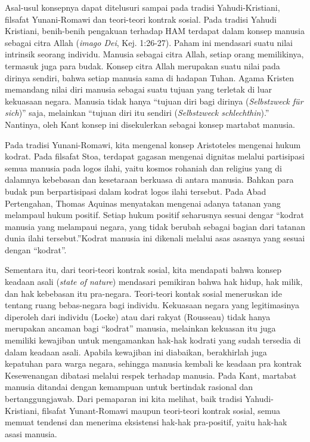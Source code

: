 \documentclass[10pt,a4paper]{article}
\begin{document}
\begin{multicols}{2}
Asal-usul konsepnya dapat ditelusuri sampai pada tradisi
Yahudi-Kristiani, filsafat Yunani-Romawi dan teori-teori kontrak sosial.
Pada tradisi Yahudi Kristiani, benih-benih pengakuan terhadap HAM
terdapat dalam konsep manusia sebagai citra Allah (\emph{imago Dei},
Kej. 1:26-27). Paham ini mendasari suatu nilai intrinsik seorang
individu. Manusia sebagai citra Allah, setiap orang memilikinya,
termasuk juga para budak. Konsep citra Allah merupakan suatu nilai pada
dirinya sendiri, bahwa setiap manusia sama di hadapan Tuhan. Agama
Kristen memandang nilai diri manusia sebagai suatu tujuan yang terletak
di luar kekuasaan negara. Manusia tidak hanya ``tujuan diri bagi dirinya
(\emph{Selbstzweck für sich})'' saja, melainkan ``tujuan diri itu
sendiri (\emph{Selbstzweck schlechthin}).'' Nantinya, oleh Kant konsep
ini disekulerkan sebagai konsep martabat manusia.

Pada tradisi Yunani-Romawi, kita mengenal konsep Aristoteles mengenai
hukum kodrat. Pada filsafat Stoa, terdapat gagasan mengenai dignitas
melalui partisipasi semua manusia pada logos ilahi, yaitu kosmos
rohaniah dan religius yang di dalamnya kebebasan dan kesetaraan berkuasa
di antara manusia. Bahkan para budak pun berpartisipasi dalam kodrat
logos ilahi tersebut. Pada Abad Pertengahan, Thomas Aquinas menyatakan
mengenai adanya tatanan yang melampaul hukum positif. Setiap hukum
positif seharusnya sesuai dengar ``kodrat manusia yang melampaui negara,
yang tidak berubah sebagai bagian dari tatanan dunia ilahi
tersebut.''Kodrat manusia ini dikenali melalui asas asasnya yang sesuai
dengan ``kodrat''.

Sementara itu, dari teori-teori kontrak sosial, kita mendapati bahwa
konsep keadaan asali (\emph{state of nature}) mendasari pemikiran bahwa
hak hidup, hak milik, dan hak kebebasan itu pra-negara. Teori-teori
kontak sosial meneruskan ide tentang ruang bebas-negara bagi individu.
Kekuasaan negara yang legitimasinya diperoleh dari individu (Locke) atau
dari rakyat (Rousseau) tidak hanya merupakan ancaman bagi ``kodrat''
manusia, melainkan kekuasan itu juga memiliki kewajiban untuk
mengamankan hak-hak kodrati yang sudah tersedia di dalam keadaan asali.
Apabila kewajiban ini diabaikan, berakhirlah juga kepatuhan para warga
negara, sehingga manusia kembali ke keadaan pra kontrak Kesewenangan
dibatasi melalui respek terhadap manusia. Pada Kant, martabat manusia
ditandai dengan kemampuan untuk bertindak rasional dan bertanggungjawab.
Dari pemaparan ini kita melihat, baik tradisi Yahudi-Kristiani, filsafat
Yunant-Romawi maupun teori-teori kontrak sosial, semua memuat tendensi
dan menerima eksistensi hak-hak pra-positif, yaitu hak-hak asasi
manusia.


\end{multicols}
\end{document}

